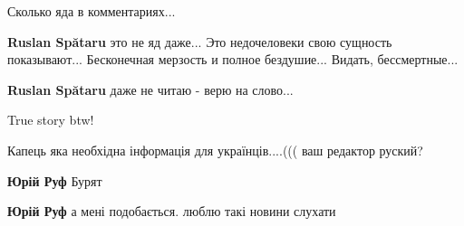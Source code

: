 \begin{itemize}
Сколько яда в комментариях... 🤦🤦🤦

\begin{itemize}
 
\textbf{Ruslan Spătaru} это не яд даже... Это недочеловеки свою сущность
показывают... Бесконечная мерзость и полное бездушие... Видать, бессмертные...

 
\textbf{Ruslan Spătaru} даже не читаю - верю на слово...
\end{itemize}

 
True story btw!

 
Капець яка необхідна інформація для українців....((( ваш редактор руский?

\begin{itemize}
 
\textbf{Юрій Руф} Бурят

 
\textbf{Юрій Руф} а мені подобається. люблю такі новини слухати


\end{itemize}
\end{itemize}
